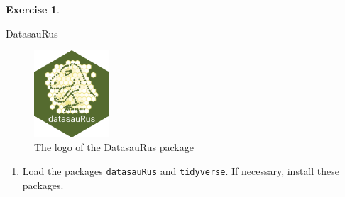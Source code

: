 \documentclass[
  12pt,
  oneside]{book}
\providecommand{\tightlist}{%
  \setlength{\itemsep}{0pt}\setlength{\parskip}{0pt}}
\theoremstyle{definition}
\theoremstyle{definition}
\theoremstyle{definition}
\newtheorem{exercise}{Exercise}[chapter]
\theoremstyle{definition}
\theoremstyle{remark}
\begin{document}
\begin{exercise}
\protect\hypertarget{exr:DatasauRus}{}\label{exr:DatasauRus}

DatasauRus

\begin{figure}
\centering
\includegraphics[width=0.25\textwidth,height=\textheight]{fig/datasaurus.png}
\caption[\label{fig:label} The logo of the DatasauRus package]{\label{fig:label} The logo of the DatasauRus package\footnotemark{}}
\end{figure}

\begin{enumerate}
\def\labelenumi{\alph{enumi})}
\tightlist
\item
  Load the packages \texttt{datasauRus} and \texttt{tidyverse}. If necessary, install these packages.
\end{enumerate}

\end{exercise}
\end{document}
